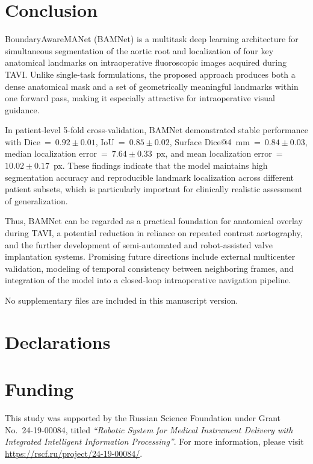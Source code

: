 \documentclass[oneside,pdflatex,sn-mathphys-num]{sn-jnl}
\begin{document}
\section{Conclusion}\label{sec:conclusion}

BoundaryAwareMANet (BAMNet) is a multitask deep learning architecture for simultaneous segmentation of the aortic root and localization of four key anatomical landmarks on intraoperative fluoroscopic images acquired during TAVI. Unlike single-task formulations, the proposed approach produces both a dense anatomical mask and a set of geometrically meaningful landmarks within one forward pass, making it especially attractive for intraoperative visual guidance.

In patient-level 5-fold cross-validation, BAMNet demonstrated stable performance with Dice~=~$0.92 \pm 0.01$, IoU~=~$0.85 \pm 0.02$, Surface Dice@4~mm~=~$0.84 \pm 0.03$, median localization error~=~$7.64 \pm 0.33$~px, and mean localization error~=~$10.02 \pm 0.17$~px. These findings indicate that the model maintains high segmentation accuracy and reproducible landmark localization across different patient subsets, which is particularly important for clinically realistic assessment of generalization.

Thus, BAMNet can be regarded as a practical foundation for anatomical overlay during TAVI, a potential reduction in reliance on repeated contrast aortography, and the further development of semi-automated and robot-assisted valve implantation systems. Promising future directions include external multicenter validation, modeling of temporal consistency between neighboring frames, and integration of the model into a closed-loop intraoperative navigation pipeline.

\backmatter


No supplementary files are included in this manuscript version.


\section*{Declarations}

\section*{Funding}

This study was supported by the Russian Science Foundation under Grant No.~24-19-00084, titled \textit{``Robotic System for Medical Instrument Delivery with Integrated Intelligent Information Processing''}. For more information, please visit \href{https://rscf.ru/project/24-19-00084/}{https://rscf.ru/project/24-19-00084/}.
\end{document}
